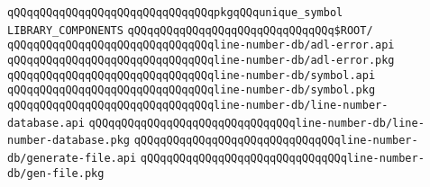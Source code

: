 \verb|qQQqqQQqqQQqqQQqqQQqqQQqqQQqqQQqpkgqQQqunique_symbol|\newline
\newline
\newline
\newline
\verb|LIBRARY_COMPONENTS|\newline
\newline
\verb|qQQqqQQqqQQqqQQqqQQqqQQqqQQqqQQq$ROOT/|\newline
\newline
\verb|qQQqqQQqqQQqqQQqqQQqqQQqqQQqqQQqline-number-db/adl-error.api|\newline
\verb|qQQqqQQqqQQqqQQqqQQqqQQqqQQqqQQqline-number-db/adl-error.pkg|\newline
\verb|qQQqqQQqqQQqqQQqqQQqqQQqqQQqqQQqline-number-db/symbol.api|\newline
\verb|qQQqqQQqqQQqqQQqqQQqqQQqqQQqqQQqline-number-db/symbol.pkg|\newline
\verb|qQQqqQQqqQQqqQQqqQQqqQQqqQQqqQQqline-number-db/line-number-database.api|\newline
\verb|qQQqqQQqqQQqqQQqqQQqqQQqqQQqqQQqline-number-db/line-number-database.pkg|\newline
\verb|qQQqqQQqqQQqqQQqqQQqqQQqqQQqqQQqline-number-db/generate-file.api|\newline
\verb|qQQqqQQqqQQqqQQqqQQqqQQqqQQqqQQqline-number-db/gen-file.pkg|\newline


